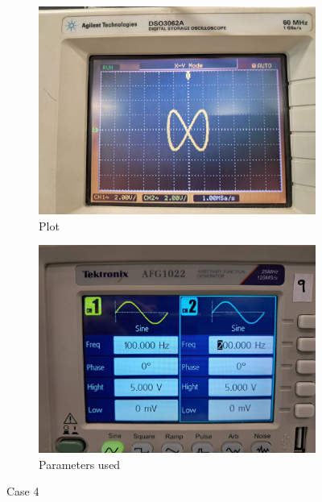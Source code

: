 \documentclass[a4paper,12pt]{article}
\begin{document}
\begin{figure}[htbp]
    \centering
    \begin{subfigure}[b]{0.45\textwidth}
        \centering
        \includegraphics[width=\linewidth]{figs/4/Plot4.jpeg}
        \caption{Plot}
        \label{fig:image1}
    \end{subfigure}
    \hfill
    \begin{subfigure}[b]{0.45\textwidth}
        \centering
        \includegraphics[width=\linewidth]{figs/4/para4.jpeg}
        \caption{Parameters used}
        \label{fig:image2}
    \end{subfigure}
    \caption{Case 4}
    \label{fig:sidebyside}
\end{figure}
\end{document}

